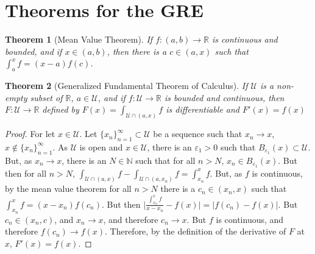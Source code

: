 \documentclass[12pt,oneside]{book}
\theoremstyle{mystyle}
\newtheorem{theorem}{Theorem}[section]
\begin{document}
\section{Theorems for the GRE}
%
\begin{theorem}[Mean Value Theorem]
If $f:(a,b)\rightarrow \mathbb{R}$ is continuous and bounded, and if $x\in (a,b)$, then there is a $c\in(a,x)$ such that $\int_{a}^{x}f = (x-a)f(c)$.
\end{theorem}
%
\begin{theorem}[Generalized Fundamental Theorem of Calculus]
If $\mathcal{U}$ is a non-empty subset of $\mathbb{R}$, $a\in \mathcal{U}$, and if $f:\mathcal{U}\rightarrow \mathbb{R}$ is bounded and continuous, then $F:\mathcal{U}\rightarrow \mathbb{R}$ defined by $F(x) = \int_{\mathcal{U}\cap (a,x)}f$ is differentiable and $F'(x) = f(x)$
\end{theorem}
\begin{proof}
For let $x\in \mathcal{U}$. Let $\{x_n\}_{n=1}^{\infty}\subset \mathcal{U}$ be a sequence such that $x_n \rightarrow x$, $x\notin \{x_n\}_{n=1}^{\infty}$. As $\mathcal{U}$ is open and $x\in \mathcal{U}$, there is an $\varepsilon_1>0$ such that $B_{\varepsilon_1}(x)\subset \mathcal{U}$. But, as $x_n\rightarrow x$, there is an $N\in \mathbb{N}$ such that for all $n>N$, $x_n\in B_{\varepsilon_1}(x)$. But then for all $n>N$, $\int_{\mathcal{U}\cap(a,x)}f - \int_{\mathcal{U}\cap(a,x_n)}f = \int_{x_n}^{x}f$. But, as $f$ is continuous, by the mean value theorem for all $n>N$ there is a $c_n\in (x_n,x)$ such that $\int_{x_n}^{x}f = (x-x_n)f(c_n)$. But then $\big|\frac{\int_{x_n}^{x}f}{x-x_n} - f(x)| = |f(c_n)-f(x)|$. But $c_n \in (x_n,c)$, and $x_n \rightarrow x$, and therefore $c_n \rightarrow x$. But $f$ is continuous, and therefore $f(c_n)\rightarrow f(x)$. Therefore, by the definition of the derivative of $F$ at $x$, $F'(x) = f(x)$. 
\end{proof}
%
\end{document}
